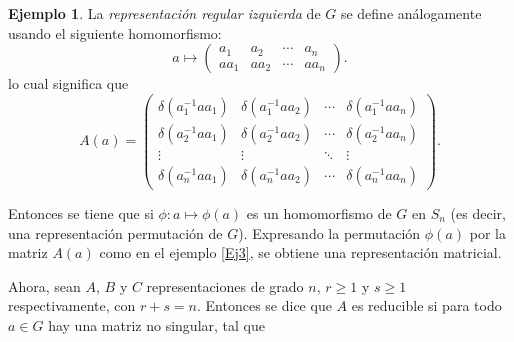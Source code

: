 \documentclass[12pt]{book}
\theoremstyle{definition}
\newtheorem{example}[theorem]{Ejemplo}
\newcounter{in}
\begin{document}
\begin{example}
  La \emph{representación regular izquierda} de $G$ se define análogamente
  usando el siguiente homomorfismo:
  \begin{equation*}
    a \mapsto
    \begin{pmatrix}
      a_{1} & a_{2} & \cdots  & a_{n}\\ 
      aa_{1} & aa_{2} & \cdots & aa_{n}
    \end{pmatrix}.
  \end{equation*}
  lo cual significa que
  \begin{equation}
    \label{eq:8}
    A\left(a\right) = 
    \begin{pmatrix}
      \delta\left(a_{1}^{-1}aa_{1}\right) & \delta\left(a_{1}^{-1}aa_{2}\right) & \cdots  & \delta\left(a_{1}^{-1}aa_{n}\right)\\
      \delta\left(a_{2}^{-1}aa_{1}\right) & \delta\left(a_{2}^{-1}aa_{2}\right) & \cdots  & \delta\left(a_{2}^{-1}aa_{n}\right)\\ 
      \vdots & \vdots & \ddots & \vdots\\
      \delta\left(a_{n}^{-1}aa_{1}\right) & \delta\left(a_{n}^{-1}aa_{2}\right) & \cdots  & \delta\left(a_{n}^{-1}aa_{n}\right)
    \end{pmatrix}
    .
  \end{equation}
\end{example}

Entonces se tiene que si $\phi \colon a \mapsto \phi\left(a\right)$ es
un homomorfismo de $G$ en $S_{n}$ (es decir, una representación
permutación de $G$). Expresando la permutación $\phi\left(a\right)$
por la matriz $A\left(a\right)$ como en el ejemplo \ref{Ej3}, se
obtiene una representación matricial.

Ahora, sean $A$, $B$ y $C$ representaciones de grado $n$,
$r \geq 1$ y $s \geq 1$ respectivamente, con $r+s=n$. Entonces se dice
que $A$ es reducible si para todo $a \in G$ hay una matriz no
singular, tal que
\end{document}
